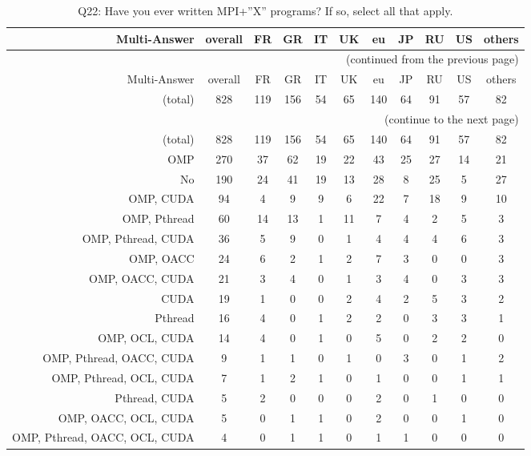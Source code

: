 \clearpage%
{\footnotesize\begin{landscape}%
\begin{longtable}[htb]{r|c|c|c|c|c|c|c|c|c|c}%
\caption{Q22: Have you ever written MPI+”X” programs? If so, select all that apply.}%
\label{tab:Q22-mans} \\%
\hline%
Multi-Answer & overall & FR & GR & IT & UK & eu & JP & RU & US & others \\
 \hline%
\endfirsthead%
\multicolumn{11}{r}{(continued from the previous page)}\\%
\hline%
Multi-Answer & overall & FR & GR & IT & UK & eu & JP & RU & US & others \\
 \hline%
\endhead%
\hline%
(total) & 828 & 119 & 156 & 54 & 65 & 140 & 64 & 91 & 57 & 82 \\%
\hline%
\multicolumn{11}{r}{(continue to the next page)}\\%
\endfoot%
\hline%
(total) & 828 & 119 & 156 & 54 & 65 & 140 & 64 & 91 & 57 & 82 \\%
\hline%
\endlastfoot%
\hline%
{OMP} & 270 & 37 & 62 & 19 & 22 & 43 & 25 & 27 & 14 & 21 \\%
{No} & 190 & 24 & 41 & 19 & 13 & 28 & 8 & 25 & 5 & 27 \\%
{OMP, CUDA} & 94 & 4 & 9 & 9 & 6 & 22 & 7 & 18 & 9 & 10 \\%
{OMP, Pthread} & 60 & 14 & 13 & 1 & 11 & 7 & 4 & 2 & 5 & 3 \\%
{OMP, Pthread, CUDA} & 36 & 5 & 9 & 0 & 1 & 4 & 4 & 4 & 6 & 3 \\%
{OMP, OACC} & 24 & 6 & 2 & 1 & 2 & 7 & 3 & 0 & 0 & 3 \\%
{OMP, OACC, CUDA} & 21 & 3 & 4 & 0 & 1 & 3 & 4 & 0 & 3 & 3 \\%
{CUDA} & 19 & 1 & 0 & 0 & 2 & 4 & 2 & 5 & 3 & 2 \\%
{Pthread} & 16 & 4 & 0 & 1 & 2 & 2 & 0 & 3 & 3 & 1 \\%
{OMP, OCL, CUDA} & 14 & 4 & 0 & 1 & 0 & 5 & 0 & 2 & 2 & 0 \\%
{OMP, Pthread, OACC, CUDA} & 9 & 1 & 1 & 0 & 1 & 0 & 3 & 0 & 1 & 2 \\%
{OMP, Pthread, OCL, CUDA} & 7 & 1 & 2 & 1 & 0 & 1 & 0 & 0 & 1 & 1 \\%
{Pthread, CUDA} & 5 & 2 & 0 & 0 & 0 & 2 & 0 & 1 & 0 & 0 \\%
{OMP, OACC, OCL, CUDA} & 5 & 0 & 1 & 1 & 0 & 2 & 0 & 0 & 1 & 0 \\%
{OMP, Pthread, OACC, OCL, CUDA} & 4 & 0 & 1 & 1 & 0 & 1 & 1 & 0 & 0 & 0 \\%

\end{longtable}
\end{landscape}}
